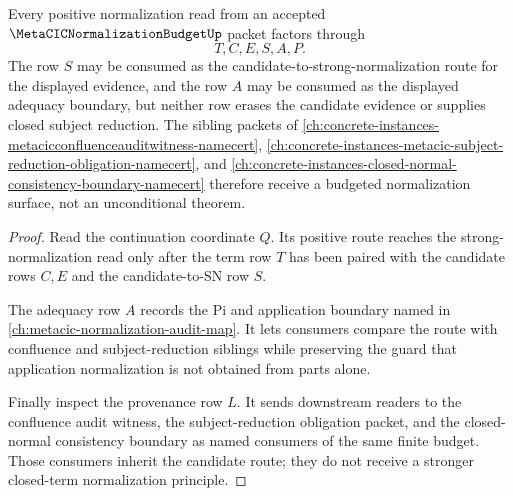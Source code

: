 \begin{theorem}
\label{thm:metacic-normalization-budget-candidate-route-scope}
Every positive normalization read from an accepted $\MetaCICNormalizationBudgetUp$ packet factors through
$$
T,C,E,S,A,P.
$$
The row $S$ may be consumed as the candidate-to-strong-normalization route for the displayed evidence, and the row $A$ may be consumed as the displayed adequacy boundary, but neither row erases the candidate evidence or supplies closed subject reduction. The sibling packets of \autoref{ch:concrete-instances-metacicconfluenceauditwitness-namecert}, \autoref{ch:concrete-instances-metacic-subject-reduction-obligation-namecert}, and \autoref{ch:concrete-instances-closed-normal-consistency-boundary-namecert} therefore receive a budgeted normalization surface, not an unconditional theorem.
\end{theorem}
\begin{proof}
Read the continuation coordinate $Q$. Its positive route reaches the strong-normalization read only after the term row $T$ has been paired with the candidate rows $C,E$ and the candidate-to-SN row $S$.

The adequacy row $A$ records the Pi and application boundary named in \autoref{ch:metacic-normalization-audit-map}. It lets consumers compare the route with confluence and subject-reduction siblings while preserving the guard that application normalization is not obtained from parts alone.

Finally inspect the provenance row $L$. It sends downstream readers to the confluence audit witness, the subject-reduction obligation packet, and the closed-normal consistency boundary as named consumers of the same finite budget. Those consumers inherit the candidate route; they do not receive a stronger closed-term normalization principle.
\end{proof}

